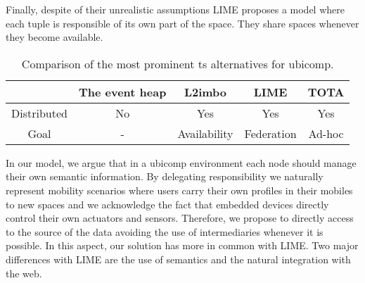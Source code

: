 Finally, despite of their unrealistic assumptions LIME proposes a model where each tuple is responsible of its own part of the space.
They share spaces whenever they become available.


\begin{table}%
  \centering
  \begin{tabular}{c|cccc}%
      ~ & The event heap & L2imbo & LIME & TOTA \\
      \hline
      \hline
      Distributed & No & Yes & Yes & Yes \\
      Goal & - & Availability & Federation & Ad-hoc \\
  \end{tabular}
  \caption{Comparison of the most prominent \acl{ts} alternatives for \acl{ubicomp}.} %
  \label{tab:ubicomp_ts_comparison}
\end{table}


\medskip

In our model, we argue that in a \ac{ubicomp} environment each node should manage their own semantic information.
By delegating responsibility 
we naturally represent mobility scenarios where users carry their own profiles in their mobiles to new spaces 
and 
we acknowledge the fact that embedded devices directly control their own actuators and sensors.
Therefore, we propose to directly access to the source of the data avoiding the use of intermediaries whenever it is possible.
In this aspect, our solution has more in common with LIME.
Two major differences with LIME are the use of semantics and the natural integration with the web. %